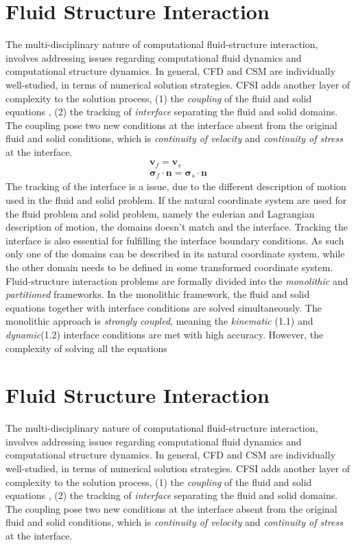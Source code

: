 \chapter{Fluid Structure Interaction}
The multi-disciplinary nature of computational fluid-structure interaction, involves addressing issues regarding computational fluid dynamics and computational structure dynamics. In general, CFD and CSM are individually well-studied, in terms of numerical solution strategies. CFSI adds another layer of complexity to the solution process, (1) the \textit{coupling} of the fluid and solid equations , (2) the tracking of \textit{interface} separating the fluid and solid domains. The coupling pose two new conditions at the interface absent from the original fluid and solid conditions, which is \textit{continuity of velocity} and \textit{continuity of stress} at the interface.
\begin{align}
\mathbf{v}_f = \mathbf{v}_s \\
\mathbf{\sigma}_f \cdot \mathbf{n} = \mathbf{\sigma}_s \cdot \mathbf{n}
\label{sec:intcond}
\end{align}
The tracking of the interface is a issue, due to the different description of motion used in the fluid and solid problem. If the natural coordinate system are used for the fluid problem and solid problem, namely the eulerian and Lagrangian description of motion, the domains doesn't match and the interface. Tracking the interface is also essential for fulfilling the interface boundary conditions. As such only one of the domains can be described in its natural coordinate system, while the other domain needs to be defined in some transformed coordinate system.    
Fluid-structure interaction problems are formally divided into the \textit{monolithic} and \textit{partitioned} frameworks.  In the monolithic framework, the fluid and solid equations together with interface conditions are solved simultaneously. The monolithic approach is  \textit{strongly coupled}, meaning the \textit{kinematic} (1.1) and \textit{dynamic}(1.2) interface conditions are met with high accuracy. However, the complexity of solving all the equations\chapter{Fluid Structure Interaction}

The multi-disciplinary nature of computational fluid-structure interaction, involves addressing issues regarding computational fluid dynamics and computational structure dynamics. In general, CFD and CSM are individually well-studied, in terms of numerical solution strategies. CFSI adds another layer of complexity to the solution process, (1) the \textit{coupling} of the fluid and solid equations , (2) the tracking of \textit{interface} separating the fluid and solid domains. The coupling pose two new conditions at the interface absent from the original fluid and solid conditions, which is \textit{continuity of velocity} and \textit{continuity of stress} at the interface.

